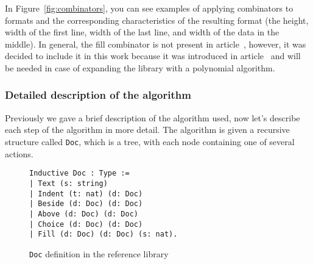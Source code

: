 \documentclass[14pt]{constructor-diploma}
\begin{document}
In Figure~\ref{fig:combinators}, you can see examples of applying combinators to formats 
and the corresponding characteristics of the resulting format 
(the height, width of the first line, width of the last line, and width of the data in the middle). 
In general, the fill combinator is not present in article~\cite{swierstra},
however, it was decided to include it in this work because it was introduced 
in article~\cites{podkopaev} and will be needed in case of expanding the library 
with a polynomial algorithm.

\subsubsection{Detailed description of the algorithm}
Previously we gave a brief description of the algorithm used, 
now let's describe each step of the algorithm in more detail.
The algorithm is given a recursive structure called \texttt{Doc}, which is a tree, 
with each node containing one of several actions.

\begin{figure}[H]
\begin{mdframed}[backgroundcolor=bg]
\begin{verbatim}
Inductive Doc : Type :=
| Text (s: string)
| Indent (t: nat) (d: Doc)
| Beside (d: Doc) (d: Doc)
| Above (d: Doc) (d: Doc)
| Choice (d: Doc) (d: Doc)
| Fill (d: Doc) (d: Doc) (s: nat).
\end{verbatim}
\end{mdframed}
\caption{\texttt{Doc} definition in the reference library~\cite{korolihin}}
\end{figure}
\end{document}
